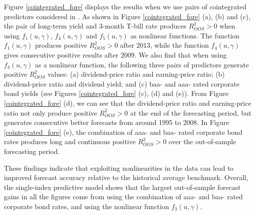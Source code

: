 \documentclass[a4paper,12pt,times,numbered,print,index]{report}
\numberwithin{equation}{section}
\begin{document}
	Figure \ref{cointegrated_fore} displays the results when we use pairs of cointegrated predictors considered in \cite{zhou2018semiparametric}. As shown in Figure \ref{cointegrated_fore} (a), (b) and (c), the pair of long-term yield and 3-month T-bill rate produces $ R^2_{OOS}>0 $ when using  $f_1\left( u,\gamma\right)$, $f_4\left( u,\gamma\right)$ and $f_5\left( u,\gamma\right)$ as nonlinear functions. The function $f_1\left( u,\gamma\right)$ produces positive $ R^2_{OOS}>0 $ after 2013, while the function  $f_4\left( u,\gamma\right)$ gives consecutive positive results after 2009. We also find that when using $f_3\left( u,\gamma\right)$ as a nonlinear function, the following three pairs of predictors generate positive $R_{OOS}^{2}$ values: (a) dividend-price ratio and earning-price ratio; (b) dividend-price ratio and dividend yield; and (c) baa- and aaa- rated corporate bond yields (see Figures \ref{cointegrated_fore} (c), (d) and (e)). From Figure \ref{cointegrated_fore} (d), we can see that the dividend-price ratio and earning-price ratio not only produce positive $ R^2_{OOS}>0 $ at the end of the forecasting period, but generates consecutive better forecasts from around 1995 to 2008. In Figure \ref{cointegrated_fore} (e), the combination of aaa- and baa- rated corporate bond rates produces long and continuous positive $ R^2_{OOS}>0 $ over the out-of-sample forecasting period.
	
	
	These findings indicate that exploiting nonlinearities in the data can lead to improved forecast
	accuracy relative to the historical average benchmark. Overall, the single-index predictive model
	shows that the largest out-of-sample forecast gains in all the figures come from using the
	combination of aaa- and baa- rated corporate bond rates, and using the nonlinear function
	$f_3\left( u,\gamma\right)$. \\
	
\end{document}
